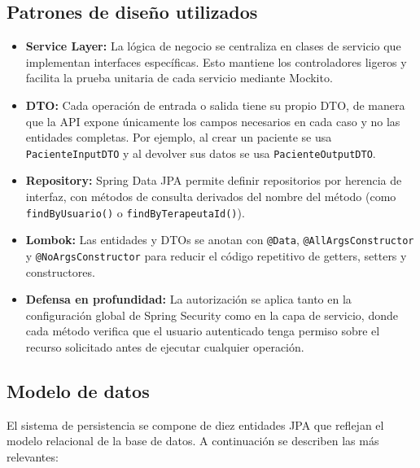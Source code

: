 \subsection{Patrones de diseño utilizados}
\begin{itemize}
    \item \textbf{Service Layer:} La lógica de negocio se centraliza en clases de servicio que implementan interfaces específicas. Esto mantiene los controladores ligeros y facilita la prueba unitaria de cada servicio mediante Mockito.
    \item \textbf{DTO:} Cada operación de entrada o salida tiene su propio DTO, de manera que la API expone únicamente los campos necesarios en cada caso y no las entidades completas. Por ejemplo, al crear un paciente se usa \texttt{PacienteInputDTO} y al devolver sus datos se usa \texttt{PacienteOutputDTO}.
    \item \textbf{Repository:} Spring Data JPA permite definir repositorios por herencia de interfaz, con métodos de consulta derivados del nombre del método (como \texttt{findByUsuario()} o \texttt{findByTerapeutaId()}).
    \item \textbf{Lombok:} Las entidades y DTOs se anotan con \texttt{@Data}, \texttt{@AllArgsConstructor} y \texttt{@NoArgsConstructor} para reducir el código repetitivo de getters, setters y constructores.
    \item \textbf{Defensa en profundidad:} La autorización se aplica tanto en la configuración global de Spring Security como en la capa de servicio, donde cada método verifica que el usuario autenticado tenga permiso sobre el recurso solicitado antes de ejecutar cualquier operación.
\end{itemize}

\subsection{Modelo de datos}
El sistema de persistencia se compone de diez entidades JPA que reflejan el modelo relacional de la base de datos. A continuación se describen las más relevantes:

